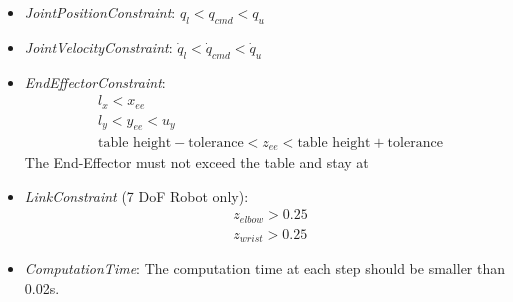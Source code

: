 \begin{itemize}
    \item \textit{JointPositionConstraint}: $q_l < q_{cmd} < q_u$
    \item \textit{JointVelocityConstraint}: $\dot{q}_l < \dot{q}_{cmd} < \dot{q}_u$
    \item \textit{EndEffectorConstraint}:
        \begin{equation*}
            \begin{aligned}
                & l_x < x_{ee} \\
                & l_y < y_{ee} < u_y \\
                & \text{table height} - \text{tolerance} < z_{ee} < \text{table height} + \text{tolerance}
            \end{aligned}
        \end{equation*}
    The End-Effector must not exceed the table and stay at
    \item \textit{LinkConstraint} (7 DoF Robot only):
    \begin{equation*}
        \begin{aligned}
            & z_{elbow} > 0.25 \\
            & z_{wrist} > 0.25
        \end{aligned}
    \end{equation*}
    \item \textit{ComputationTime}: The computation time at each step should be smaller than 0.02s.
\end{itemize}

